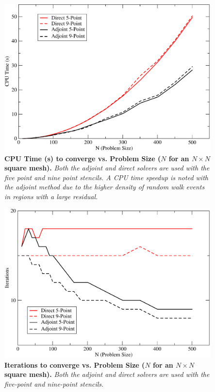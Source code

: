 \begin{figure}[t!]
  \centering
  \includegraphics[width=5in,clip]{chapters/mc_background/dir_adj_cpu.pdf}
  \caption{\textbf{CPU Time (s) to converge vs. Problem Size ($N$ for
      an $N \times N$ square mesh).} \textit{Both the adjoint and
      direct solvers are used with the five point and nine point
      stencils. A CPU time speedup is noted with the adjoint method
      due to the higher density of random walk events in regions with
      a large residual.}}
  \label{fig:poisson_cpu_time}
\end{figure}

\begin{figure}[t!]
  \centering
  \includegraphics[width=5in,clip]{chapters/mc_background/dir_adj_iterations.pdf}
  \caption{\textbf{Iterations to converge vs. Problem Size ($N$ for an
      $N \times N$ square mesh).} \textit{Both the adjoint and direct
      solvers are used with the five-point and nine-point stencils.}}
  \label{fig:poisson_iterations}
\end{figure}

